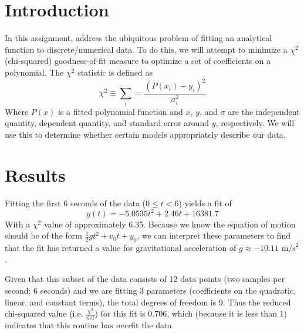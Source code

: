 \documentclass{article}
\author{\hwauthor}
\title{\hwtitle}
\date{\hwdate}
\begin{document}
\maketitle
\thispagestyle{fancy}

\section{Introduction}

In this assignment, address the ubiquitous problem of fitting an analytical function to discrete/numerical data. To do this, we will attempt to minimize a $\chi^2$ (chi-squared) goodness-of-fit measure to optimize a set of coefficients on a polynomial. The $\chi^2$ statistic is defined as \begin{equation*}
    \chi^2 \equiv \sum_i = \frac{(P(x_i)-y_i)^2}{\sigma_i^2}
\end{equation*}
Where $P(x)$ is a fitted polynomial function and $x$, $y$, and $\sigma$ are the independent quantity, dependent quantity, and standard error around $y$, respectively. We will use this to determine whether certain models appropriately describe our data.

\section{Results}

\bigskip
{}
\medskip

Fitting the first 6 seconds of the data ($0\leq t < 6$) yields a fit of \begin{equation*}
    y(t) = -5.0535t^2 + 2.46 t + 16381.7
\end{equation*}
With a $\chi^2$ value of approximately 6.35. Because we know the equation of motion should be of the form $\displaystyle \frac{1}{2}gt^2 + v_0 t + y_0$, we can interpret these parameters to find that the fit has returned a value for gravitational acceleration of $g\approx-10.11\text{ m/s}^2$.

Given that this subset of the data consists of 12 data points (two samples per second; 6 seconds) and we are fitting 3 parameters (coefficients on the quadratic, linear, and constant terms), the total degrees of freedom is 9. Thus the reduced chi-squared value (i.e. $\frac{\chi^2}{\text{dof}}$) for this fit is 0.706, which (because it is less than 1) indicates that this routine has \emph{over}fit the data.
\end{document}

